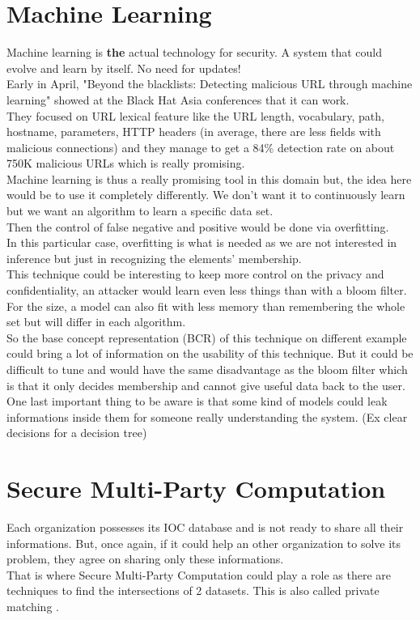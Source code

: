 \documentclass{eplmastersthesis}
\begin{document}
\section{Machine Learning}

Machine learning is \textbf{the} actual technology for security. A system that could evolve and learn by itself. No need for updates! \\
Early in April, "Beyond the blacklists: Detecting malicious URL through machine learning" showed at the Black Hat Asia conferences that it can work.\\
They focused on URL lexical feature like the URL length, vocabulary, path, hostname, parameters, HTTP headers (in average, there are less fields with malicious connections) and they manage to get a 84\% detection rate on about 750K malicious URLs which is really promising.\\

Machine learning is thus a really promising tool in this domain but, the idea here would be to use it completely differently. We don't want it to continuously learn but we want an algorithm to learn a specific data set.\\
Then the control of false negative and positive would be done via overfitting.\\
In this particular case, overfitting is what is needed as we are not interested in inference but just in recognizing the elements' membership.\\

This technique could be interesting to keep more control on the privacy and confidentiality, an attacker would learn even less things than with a bloom filter.\\
For the size, a model can also fit with less memory than remembering the whole set but will differ in each algorithm.\\
So the base concept representation (BCR) of this technique on different example could bring a lot of information on the usability of this technique. But it could be difficult to tune and would have the same disadvantage as the bloom filter which is that it only decides membership and cannot give useful data back to the user. One last important thing to be aware is that some kind of models could leak informations inside them for someone really understanding the system. (Ex clear decisions for a decision tree)\\



\section{Secure Multi-Party Computation}
Each organization possesses its IOC database and is not ready to share all their informations. But, once again, if it could help an other organization to solve its problem, they agree on sharing only these informations.\\
That is where Secure Multi-Party Computation could play a role as there are techniques to find the intersections of 2 datasets. This is also called private matching \cite{agrawal2003information, li2005private}.\\
\end{document}
